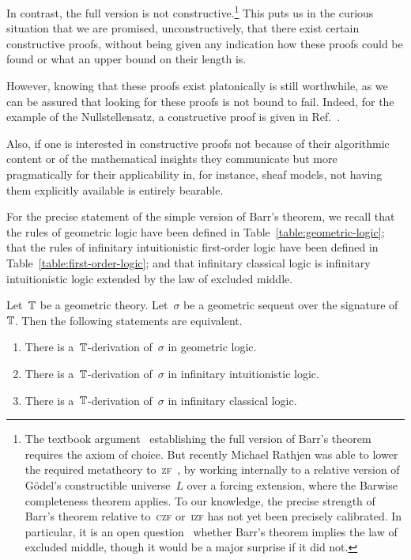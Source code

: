 \documentclass{ws-rv9x6}
\begin{document}
{In contrast, the full version is not constructive.\footnote{%
The textbook argument~\cite[Theorem~7.57]{johnstone:topos-theory} establishing
the full version of Barr's theorem requires the axiom of choice. But recently
Michael Rathjen was able to lower the required metatheory
to~\textsc{zf}~\cite[Remark~4.2]{rathjen:barr}, by working internally to a
relative version of Gödel's constructible universe~$L$ over a forcing
extension, where the Barwise completeness theorem applies. To our knowledge,
the precise strength of Barr's theorem relative to~\textsc{czf} or~\textsc{izf}
has not yet been precisely calibrated. In particular, it is an open
question~\cite{henry:question-barr} whether Barr's theorem implies the law of
excluded middle, though it would be a major surprise if it did not.}
This puts us in the curious situation that we are promised, unconstructively,
that there exist certain constructive proofs, without being given any indication how
these proofs could be found or what an upper bound on their length is.

However, knowing that these proofs exist platonically is still worthwhile, as
we can be assured that looking for these proofs is not bound to fail. Indeed,
for the example of the Nullstellensatz, a constructive proof is given
in Ref.~\cite[Theorem~9.7]{lombardi-quitte:constructive-algebra}.

Also, if one is interested in constructive proofs not because of their
algorithmic content or of the mathematical insights they communicate but more
pragmatically for their applicability in, for instance, sheaf models, not
having them explicitly available is entirely bearable.

For the precise statement of the simple version of Barr's theorem, we recall
that the rules of geometric logic have been defined in
Table~\ref{table:geometric-logic}; that the rules of infinitary intuitionistic
first-order logic have been defined in Table~\ref{table:first-order-logic}; and
that infinitary classical logic is infinitary intuitionistic logic extended by
the law of excluded middle.
\begin{theorem}
\label{thm:baby-barr}
Let~$\mathbb{T}$ be a geometric theory.
Let~$\sigma$ be a geometric sequent over the signature of~$\mathbb{T}$. Then the
following statements are equivalent.
\begin{enumerate}
\item There is a~$\mathbb{T}$-derivation of~$\sigma$ in geometric logic.
\item There is a~$\mathbb{T}$-derivation of~$\sigma$ in infinitary intuitionistic
logic.
\item There is a~$\mathbb{T}$-derivation of~$\sigma$ in infinitary classical logic.
\end{enumerate}
\end{theorem}

}
\end{document}

